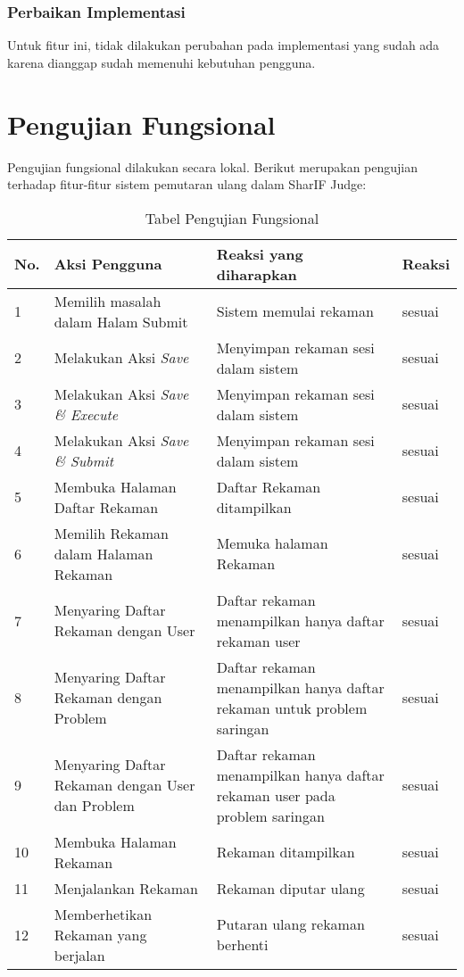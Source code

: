 \subsubsection{Perbaikan Implementasi}

Untuk fitur ini, tidak dilakukan perubahan pada implementasi yang sudah ada karena dianggap sudah memenuhi kebutuhan pengguna.

\section{Pengujian Fungsional}
\label{sec:5:fungsional}

Pengujian fungsional dilakukan secara lokal. Berikut merupakan pengujian terhadap fitur-fitur sistem pemutaran ulang dalam SharIF Judge:

\begin{table}[H]
	\centering
	\caption{Tabel Pengujian Fungsional}
	\begin{tabular}{|p{0.5cm}| p{5.5cm}| p{6cm}| p{2.5cm}|} \hline
	No.	& Aksi Pengguna	& Reaksi yang diharapkan & Reaksi \\ \hline
	1 	& Memilih masalah dalam Halam Submit & Sistem memulai rekaman &	sesuai	\\ \hline
	2 	& Melakukan Aksi \textit{Save} & Menyimpan rekaman sesi dalam sistem & sesuai	\\ \hline
	3 	& Melakukan Aksi \textit{Save \& Execute} & Menyimpan rekaman sesi dalam sistem & sesuai	\\ \hline
	4 	& Melakukan Aksi \textit{Save \& Submit} & Menyimpan rekaman sesi dalam sistem & sesuai	\\ \hline
	5 	& Membuka Halaman Daftar Rekaman & Daftar Rekaman ditampilkan & sesuai	\\ \hline
	6 	& Memilih Rekaman dalam Halaman Rekaman & Memuka halaman Rekaman & sesuai	\\ \hline
	7 	& Menyaring Daftar Rekaman dengan User & Daftar rekaman menampilkan hanya daftar rekaman user & sesuai	\\ \hline
	8 	& Menyaring Daftar Rekaman dengan Problem & Daftar rekaman menampilkan hanya daftar rekaman untuk problem saringan & sesuai	\\ \hline
	9 	& Menyaring Daftar Rekaman dengan User dan Problem & Daftar rekaman menampilkan hanya daftar rekaman user pada problem saringan & sesuai	\\ \hline
	10 	& Membuka Halaman Rekaman & Rekaman ditampilkan & sesuai	\\ \hline
	11 	& Menjalankan Rekaman & Rekaman diputar ulang & sesuai	\\ \hline
	12 	& Memberhetikan Rekaman yang berjalan & Putaran ulang rekaman berhenti & sesuai	\\ \hline

	\end{tabular}
	\label{table:fungsional}
\end{table}

